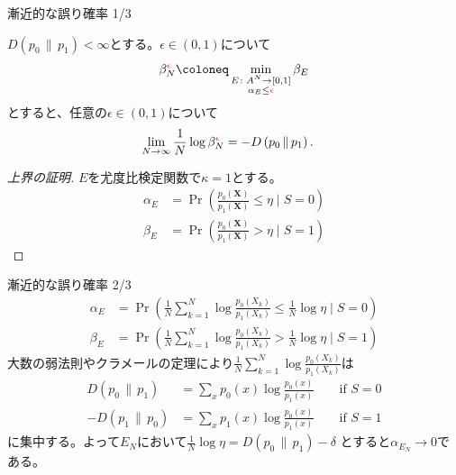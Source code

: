 \documentclass[lualatex,handout]{beamer}
\newcommand{\mycolor}[2]{%
  \begingroup
  \colorlet{currentcolor}{.}%
  \color{#1}#2%
  \color{currentcolor}%
  \endgroup
}
\newcommand{\emm}[1]{\mycolor{red}{#1}}
\newcommand{\expt}[1]{\mathbb{E}\left[#1\right]}
\newcommand\KL[2]{D\left(#1\,\|\,#2\right)}
\theoremstyle{definition}
\begin{document}
\begin{frame}{漸近的な誤り確率 1/3}
\footnotesize
\begin{theorem}[シュタインの補題]
$\KL{p_0}{p_1}<\infty$とする。$\epsilon\in(0,1)$について
\begin{align*}
\beta_N^{\emm{\epsilon}} \coloneq \min_{\substack{E\colon A^N\to[0,1]\\ \alpha_E\le{\emm{\epsilon}}}} \beta_E
\end{align*}
とすると、任意の$\epsilon\in(0,1)$について
\begin{align*}
\lim_{N\to\infty}\frac1N \log\beta_N^{\emm{\epsilon}} &= -\KL{p_0}{p_1}.
\end{align*}
\end{theorem}
\begin{proof}[上界の証明]
$E$を尤度比検定関数で$\kappa=1$とする。
\begin{align*}
\alpha_E &= \Pr\left(\frac{p_0(\symbf{X})}{p_1(\symbf{X})} \le \eta\mid S = 0\right)\\
\beta_E &= \Pr\left(\frac{p_0(\symbf{X})}{p_1(\symbf{X})} > \eta\mid S = 1\right)
\end{align*}
\end{proof}
\end{frame}

\begin{frame}{漸近的な誤り確率 2/3}
\small
\begin{align*}
\alpha_E &= \Pr\left(\frac1N\sum_{k=1}^N\log \frac{p_0(X_k)}{p_1(X_k)} \le \frac1N\log\eta\mid S = 0\right)\\
\beta_E &= \Pr\left(\frac1N\sum_{k=1}^N\log \frac{p_0(X_k)}{p_1(X_k)} > \frac1N\log\eta\mid S = 1\right)
\end{align*}
大数の弱法則やクラメールの定理により$\frac1N\sum_{k=1}^N\log \frac{p_0(X_k)}{p_1(X_k)}$は
\begin{align*}
\KL{p_0}{p_1} &= \sum_{x} p_0(x) \log\frac{p_0(x)}{p_1(x)}\qquad\text{if } S = 0\\
-\KL{p_1}{p_0} &= \sum_{x} p_1(x) \log\frac{p_0(x)}{p_1(x)}\qquad\text{if } S = 1
\end{align*}
に集中する。よって$E_N$において$\frac1N\log\eta = \KL{p_0}{p_1} - \delta$ とすると$\alpha_{E_N}\to 0$である。
\end{frame}
\end{document}
